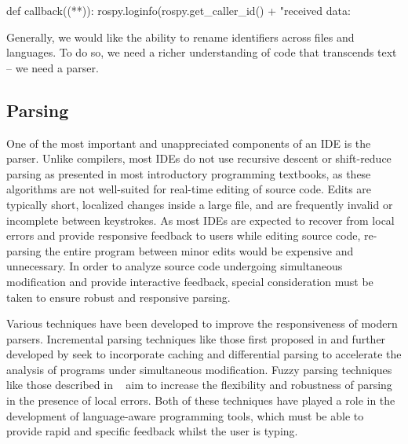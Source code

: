 \documentclass[12pt,initial,twoside,maitrise]{dms}
\numberwithin{equation}{section}
\numberwithin{table}{chapter}
\numberwithin{figure}{chapter}
\begin{document}
\begin{pythonlisting}
def callback((**)):
    rospy.loginfo(rospy.get_caller_id() + "received data: %
\end{pythonlisting}
%
Generally, we would like the ability to rename identifiers across files and languages. To do so, we need a richer understanding of code that transcends text -- we need a parser.

\subsection{Parsing}\label{subsec:the-parser}

One of the most important and unappreciated components of an IDE is the parser. Unlike compilers, most IDEs do not use recursive descent or shift-reduce parsing as presented in most introductory programming textbooks, as these algorithms are not well-suited for real-time editing of source code. Edits are typically short, localized changes inside a large file, and are frequently invalid or incomplete between keystrokes. As most IDEs are expected to recover from local errors and provide responsive feedback to users while editing source code, re-parsing the entire program between minor edits would be expensive and unnecessary. In order to analyze source code undergoing simultaneous modification and provide interactive feedback, special consideration must be taken to ensure robust and responsive parsing.

Various techniques have been developed to improve the responsiveness of modern parsers. Incremental parsing techniques like those first proposed in \citet{ghezzi1979incremental} and further developed by \citet{wagner1997practical,wagner1997incremental} seek to incorporate caching and differential parsing to accelerate the analysis of programs under simultaneous modification. Fuzzy parsing techniques like those described in ~\citet{koppler1997systematic} aim to increase the flexibility and robustness of parsing in the presence of local errors. Both of these techniques have played a role in the development of language-aware programming tools, which must be able to provide rapid and specific feedback whilst the user is typing.
\end{document}

